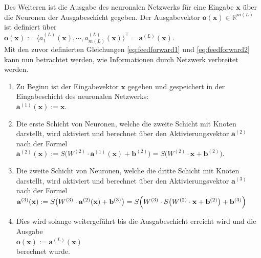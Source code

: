 Des Weiteren ist die Ausgabe des neuronalen Netzwerks für eine Eingabe $\mathbf{x}$ über die Neuronen der Ausgabeschicht gegeben. Der Ausgabevektor $\mathbf{o}(\mathbf{x}) \in \mathbb{R}^{m(L)}$ ist definiert über
\\[0.2cm]
\hspace*{1.3cm}
$\mathbf{o}(\mathbf{x}) := \langle a^{(L)}_1(\mathbf{x}), \cdots, a^{(L)}_{m(L)}(\mathbf{x}) \rangle^\top = \mathbf{a}^{(L)}(\mathbf{x})$.
\\[0.2cm]
Mit den zuvor definierten Gleichungen \ref{eq:feedforward1} und \ref{eq:feedforward2} kann nun betrachtet werden, wie Informationen durch Netzwerk verbreitet werden.
\begin{enumerate}
\item Zu Beginn ist der Eingabevektor $\mathbf{x}$ gegeben und gespeichert in der Eingabeschicht des neuronalen Netzwerks: 
      \\[0.2cm]
      \hspace*{1.3cm}
      $\mathbf{a}^{(1)}(\mathbf{x}) := \mathbf{x}$.
\item Die erste Schicht von Neuronen, welche die zweite Schicht mit Knoten darstellt, wird aktiviert und berechnet über den Aktivierungsvektor $\mathbf{a}^{(2)}$ nach der Formel
      \\[0.2cm]
      \hspace*{1.3cm}
      $\mathbf{a}^{(2)}(\mathbf{x}) := S\bigl(W^{(2)} \cdot \mathbf{a}^{(1)}(\mathbf{x}) + \mathbf{b}^{(2)}\bigr) = 
                                        S\bigl(W^{(2)} \cdot \mathbf{x} + \mathbf{b}^{(2)}\bigr)
      $.
\item Die zweite Schicht von Neuronen, welche die dritte Schicht mit Knoten darstellt, wird aktiviert und berechnet über den Aktivierungsvektor $\mathbf{a}^{(3)}$ nach der Formel
      \\[0.2cm]
      \hspace*{1.3cm}
      $\mathbf{a}^{(3)}(\mathbf{x}) := S\bigl(W^{(3)} \cdot \mathbf{a}^{(2)}(\mathbf{x}) + \mathbf{b}^{(3)}\bigr)
                          = S\Bigl(W^{(3)} \cdot S\bigl(W^{(2)} \cdot \mathbf{x} + \mathbf{b}^{(2)}\bigr) + \mathbf{b}^{(3)}\Bigr)
        $
\item Dies wird solange weitergeführt bis die Ausgabeschicht erreicht wird und die Ausgabe
      \\[0.2cm]
      \hspace*{1.3cm}
      $\mathbf{o}(\mathbf{x}) := \mathbf{a}^{(L)}(\mathbf{x})$
      \\[0.2cm]
      berechnet wurde. 
\end{enumerate}
